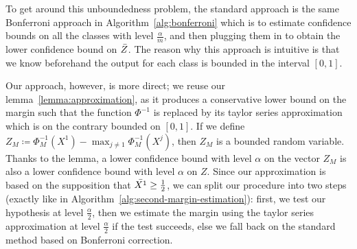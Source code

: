 To get around this unboundedness problem, the standard approach is the same Bonferroni approach in Algorithm~\ref{alg:bonferroni} which is to estimate confidence bounds on all the classes with level $\frac{\alpha}{m}$, and then plugging them in to obtain the lower confidence bound on $\Bar{Z}$.
The reason why this approach is intuitive is that we know beforehand the output for each class is bounded in the interval $[0,1]$.

Our approach, however, is more direct; we reuse our lemma~\ref{lemma:approximation}, as it produces a conservative lower bound on the margin such that the function $\Phi^{-1}$ is replaced by its taylor series approximation which is on the contrary bounded on $[0,1]$.
If we define $Z_M\coloneqq\Phi^{-1}_M(X^1)-\max_{j \neq 1}\Phi^{-1}_M(X^j)$, then $Z_M$ is a bounded random variable.
Thanks to the lemma, a lower confidence bound with level $\alpha$ on the vector $Z_M$ is also a lower confidence bound with level $\alpha$ on $Z$.
Since our approximation is based on the supposition that $\Bar{X^1}\geq\frac{1}{2}$, we can split our procedure into two steps (exactly like in Algorithm~\ref{alg:second-margin-estimation}): first, we test our hypothesis at level $\frac{\alpha}{2}$, then we estimate the margin using the taylor series approximation at level $\frac{\alpha}{2}$ if the test succeeds, else we fall back on the standard method based on Bonferroni correction.


